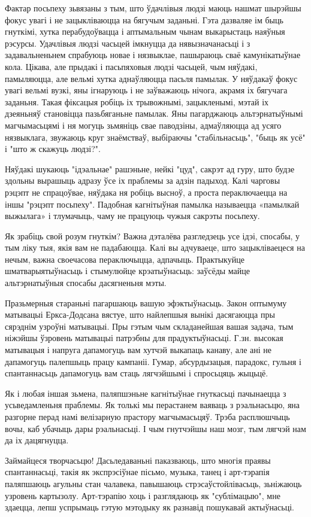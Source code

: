 Фактар посьпеху зьвязаны з тым, што ўдачлівыя людзі маюць нашмат шырэйшы фокус увагі і не зацыкліваюцца на бягучым заданьні. Гэта дазваляе ім быць гнуткімі, хутка перабудоўвацца і аптымальным чынам выкарыстаць наяўныя рэсурсы. Удачлівыя людзі часьцей імкнуцца да нявызначанасьці і з задавальненьнем спрабуюць новае і нязвыклае, пашыраюць сваё камунікатыўнае кола. Цікава, але прыдакі і пасьпяховыя людзі часьцей, чым няўдакі, памыляюцца, але вельмі хутка аднаўляюцца пасьля памылак. У няўдакаў фокус увагі вельмі вузкі, яны ігнаруюць і не заўважаюць нічога, акрамя іх бягучага заданьня. Такая фіксацыя робіць іх трывожнымі, зацыкленымі, мэтай іх дзеяньняў становіцца пазьбяганьне памылак. Яны пагарджаюць альтэрнатыўнымі магчымасьцямі і ня могуць зьмяніць свае паводзіны, адмаўляюцца ад усяго нязвыклага, звужаюць круг знаёмстваў, выбіраючы "стабільнасьць", "быць як усё" і "што ж скажуць людзі?". 

Няўдакі шукаюць "ідэальнае" рашэньне, нейкі "цуд", сакрэт ад гуру, што будзе здольны вырашыць адразу ўсе іх праблемы за адзін падыход. Калі чарговы рэцэпт не спрацоўвае, няўдака ня робіць высноў, а проста пераключаецца на іншы "рэцэпт посьпеху". Падобная кагнітыўная памылка называецца «памылкай выжылага» і тлумачыць, чаму не працуюць чужыя сакрэты посьпеху. 

Як зрабіць свой розум гнуткім? Важна дэталёва разгледзець усе ідэі, спосабы, у тым ліку тыя, якія вам не падабаюцца. Калі вы адчуваеце, што зацыкліваецеся на нечым, важна своечасова пераключыцца, адпачыць. Практыкуйце шматварыятыўнасьць і стымулюйце крэатыўнасьць: заўсёды майце альтэрнатыўныя спосабы дасягненьня мэты. 

Празьмерныя стараньні пагаршаюць вашую эфэктыўнасьць. Закон оптымуму матывацыі Еркса-Додсана вястуе, што найлепшыя вынікі дасягаюцца пры сярэднім узроўні матывацыі. Пры гэтым чым складанейшая вашая задача, тым ніжэйшы ўзровень матывацыі патрэбны для прадуктыўнасьці. Г.зн. высокая матывацыя і напруга дапамогуць вам хутчэй выкапаць канаву, але ані не дапамогуць палепшыць працу кампаніі. Гумар, абсурдызацыя, парадокс, гульня і спантаннасьць дапамогуць вам стаць лягчэйшымі і спросьцяць жыцьцё.

Як і любая іншая зьмена, паляпшэньне кагнітыўнае гнуткасьці пачынаецца з усьведамленьня праблемы. Як толькі мы перастанем ваяваць з рэальнасьцю, яна разгорне перад намі велізарную прастору магчымасьцяў. Трэба расплюшчыць вочы, каб убачыць дары рэальнасьці. І чым гнутчэйшы наш мозг, тым лягчэй нам да іх дацягнуцца.

Займайцеся творчасьцю! Дасьледаваньні паказваюць, што многія праявы спантаннасьці, такія як экспрэсіўнае пісьмо, музыка, танец і арт-тэрапія паляпшаюць агульны стан чалавека, павышаюць стрэсаўстойлівасьць, зьніжаюць узровень картызолу. Арт-тэрапію хоць і разглядаюць як "сублімацыю", мне здаецца, лепш успрымаць гэтую мэтодыку як разнавід пошукавай актыўнасьці.


